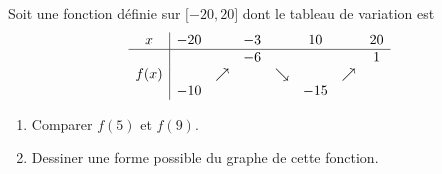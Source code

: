 
\begin{exercice}\label{exosmath-0209}

    Soit une fonction définie sur \( \mathopen[ -20 , 20 \mathclose]\) dont le tableau de variation est
\begin{equation*}
    \begin{array}[]{c|ccccccc}
        x&-20&&-3&&10&&20\\
        \hline
        &&&-6&&&&1\\
        f(x)&&\nearrow&&\searrow&&\nearrow\\
        &-10&&&&-15
    \end{array}
\end{equation*}
\begin{enumerate}
    \item
Comparer \( f(5)\) et \( f(9)\).
\item
    Dessiner une forme possible du graphe de cette fonction.
\end{enumerate}

\end{exercice}
